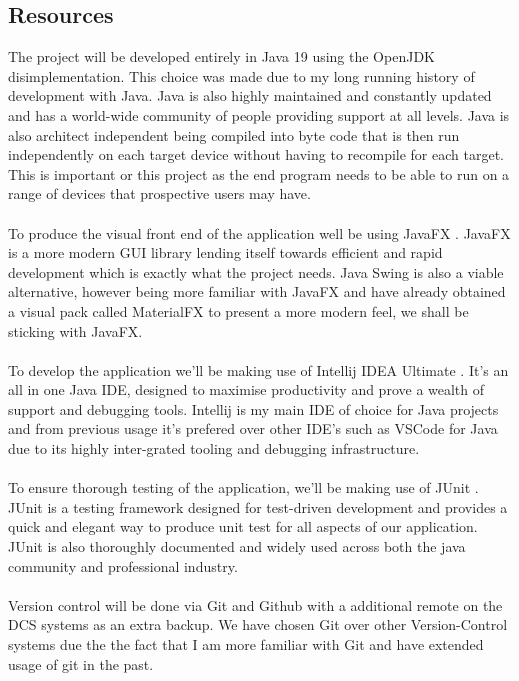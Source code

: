 \documentclass[a4paper,fleqn,12pt]{article}
\begin{document}
\subsection{Resources}
The project will be developed entirely in Java 19 \cite{sunmicrosystems_2022_java} using the OpenJDK \cite{oraclecorporation_2022_openjdk} disimplementation. This choice was made due to my long running history of development with Java. Java is also highly maintained and constantly updated and has a world-wide community of people providing support at all levels. Java is also architect independent being compiled into byte code that is then run independently on each target device without having to recompile for each target. This is important or this project as the end program needs to be able to run on a range of devices that prospective users may have.
\\\\
To produce the visual front end of the application well be using JavaFX \cite{sunmicrosystems_2022_javafx}. JavaFX is a more modern GUI library lending itself towards efficient and rapid development which is exactly what the project needs. Java Swing is also a viable alternative, however being more familiar with JavaFX and have already obtained a visual pack called MaterialFX \cite{palexdev_2022_materialfx} to present a more modern feel, we shall be sticking with JavaFX.
\\\\
To develop the application we'll be making use of Intellij IDEA Ultimate \cite{jetbrains_2022_intellij}. It's an all in one Java IDE, designed to maximise productivity and prove a wealth of support and debugging tools. Intellij is my main IDE of choice for Java projects and from previous usage it's prefered over other IDE's such as VSCode for Java due to its highly inter-grated tooling and debugging infrastructure.
\\\\
To ensure thorough testing of the application, we'll be making use of JUnit \cite{junitteam_2019_junit}. JUnit is a testing framework designed for test-driven development and provides a quick and elegant way to produce unit test for all aspects of our application. JUnit is also thoroughly documented and widely used across both the java community and professional industry.
\\\\
Version control will be done via Git \cite{git_2022_git} and Github \cite{github_2013_github} with a additional remote on the DCS systems as an extra backup. We have chosen Git over other Version-Control systems due the the fact that I am more familiar with Git and have extended usage of git in the past.
\end{document}
